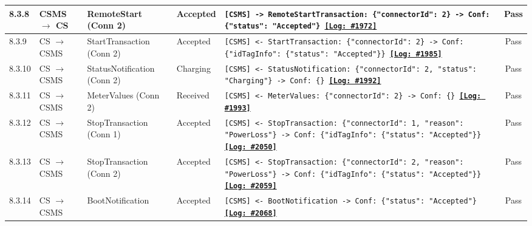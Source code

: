 \documentclass[10pt, a4paper, landscape]{article}
\begin{document}
\begin{longtable}{|p{1.0cm}|p{2.5cm}|p{4.0cm}|p{5.0cm}|p{10.0cm}|c|}
\hline
8.3.8 & CSMS $\to$ CS & RemoteStart (Conn 2) & Accepted & \footnotesize\texttt{[CSMS] -> RemoteStartTransaction: \{"connectorId": 2\} \newline [CS] -> Conf: \{"status": "Accepted"\} \newline \hyperref[log:8.3.8]{\textbf{[Log: \#1972]}}} & Pass \\
\hline
8.3.9 & CS $\to$ CSMS & StartTransaction (Conn 2) & Accepted & \footnotesize\texttt{[CSMS] <- StartTransaction: \{"connectorId": 2\} \newline [CSMS] -> Conf: \{"idTagInfo": \{"status": "Accepted"\}\} \newline \hyperref[log:8.3.9]{\textbf{[Log: \#1985]}}} & Pass \\
\hline
8.3.10 & CS $\to$ CSMS & StatusNotification (Conn 2) & Charging & \footnotesize\texttt{[CSMS] <- StatusNotification: \{"connectorId": 2, "status": "Charging"\} \newline [CSMS] -> Conf: \{\} \newline \hyperref[log:8.3.10]{\textbf{[Log: \#1992]}}} & Pass \\
\hline
8.3.11 & CS $\to$ CSMS & MeterValues (Conn 2) & Received & \footnotesize\texttt{[CSMS] <- MeterValues: \{"connectorId": 2\} \newline [CSMS] -> Conf: \{\} \newline \hyperref[log:8.3.11]{\textbf{[Log: \#1993]}}} & Pass \\
\hline
8.3.12 & CS $\to$ CSMS & StopTransaction (Conn 1) & Accepted & \footnotesize\texttt{[CSMS] <- StopTransaction: \{"connectorId": 1, "reason": "PowerLoss"\} \newline [CSMS] -> Conf: \{"idTagInfo": \{"status": "Accepted"\}\} \newline \hyperref[log:8.3.12]{\textbf{[Log: \#2050]}}} & Pass \\
\hline
8.3.13 & CS $\to$ CSMS & StopTransaction (Conn 2) & Accepted & \footnotesize\texttt{[CSMS] <- StopTransaction: \{"connectorId": 2, "reason": "PowerLoss"\} \newline [CSMS] -> Conf: \{"idTagInfo": \{"status": "Accepted"\}\} \newline \hyperref[log:8.3.13]{\textbf{[Log: \#2059]}}} & Pass \\
\hline
8.3.14 & CS $\to$ CSMS & BootNotification & Accepted & \footnotesize\texttt{[CSMS] <- BootNotification \newline [CSMS] -> Conf: \{"status": "Accepted"\} \newline \hyperref[log:8.3.14]{\textbf{[Log: \#2068]}}} & Pass \\

\end{longtable}
\end{document}
